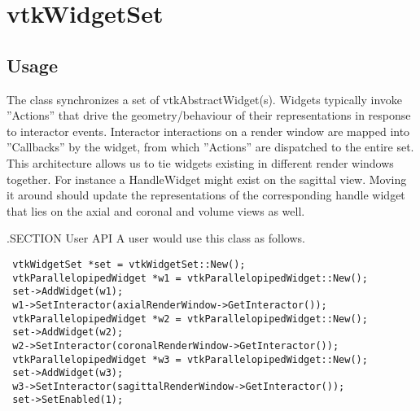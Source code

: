 \section{vtkWidgetSet}

\subsection{Usage}

 The class synchronizes a set of vtkAbstractWidget(s). Widgets typically
 invoke ''Actions'' that drive the geometry/behaviour of their representations
 in response to interactor events. Interactor interactions on a render window
 are mapped into ''Callbacks'' by the widget, from which ''Actions'' are 
 dispatched to the entire set. This architecture allows us to tie widgets
 existing in different render windows together. For instance a HandleWidget
 might exist on the sagittal view. Moving it around should update the 
 representations of the corresponding handle widget that lies on the axial 
 and coronal and volume views as well. 

 .SECTION User API
 A user would use this class as follows.
 \begin{verbatim}
 vtkWidgetSet *set = vtkWidgetSet::New();
 vtkParallelopipedWidget *w1 = vtkParallelopipedWidget::New();
 set->AddWidget(w1);
 w1->SetInteractor(axialRenderWindow->GetInteractor());
 vtkParallelopipedWidget *w2 = vtkParallelopipedWidget::New();
 set->AddWidget(w2);
 w2->SetInteractor(coronalRenderWindow->GetInteractor());
 vtkParallelopipedWidget *w3 = vtkParallelopipedWidget::New();
 set->AddWidget(w3);
 w3->SetInteractor(sagittalRenderWindow->GetInteractor());
 set->SetEnabled(1);
 \end{verbatim}

